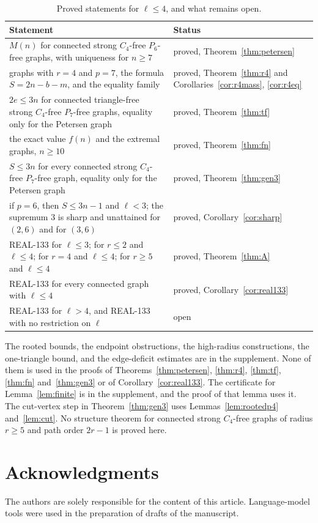 \documentclass[ASNA]{USG}
\theoremstyle{WBstyletwo}
\numberwithin{equation}{section}
\newcommand{\lr}{\ell}
\newcommand{\pp}{p}
\begin{document}
\begin{table}[ht]
\centering\small
\begin{tabular}{@{}>{\raggedright\arraybackslash}p{8.6cm}>{\raggedright\arraybackslash}p{5.0cm}@{}}
\toprule
Statement & Status\\
\midrule
$M(n)$ for connected strong $C_4$-free $P_6$-free graphs, with uniqueness for $n\ge 7$ & proved, Theorem~\ref{thm:petersen}\\
graphs with $r=4$ and $\pp=7$, the formula $S=2n-b-m$, and the equality family & proved, Theorem~\ref{thm:r4} and Corollaries~\ref{cor:r4mass}, \ref{cor:r4eq}\\
$2e\le 3n$ for connected triangle-free strong $C_4$-free $P_7$-free graphs, equality only for the Petersen graph & proved, Theorem~\ref{thm:tf}\\
the exact value $f(n)$ and the extremal graphs, $n\ge 10$ & proved, Theorem~\ref{thm:fn}\\
$S\le 3n$ for every connected strong $C_4$-free $P_7$-free graph, equality only for the Petersen graph & proved, Theorem~\ref{thm:gen3}\\
if $\pp=6$, then $S\le 3n-1$ and $\lr<3$; the supremum $3$ is sharp and unattained for $(2,6)$ and for $(3,6)$ & proved, Corollary~\ref{cor:sharp}\\
REAL-133 for $\lr\le 3$; for $r\le 2$ and $\lr\le 4$; for $r=4$ and $\lr\le 4$; for $r\ge 5$ and $\lr\le 4$ & proved, Theorem~\ref{thm:A}\\
REAL-133 for every connected graph with $\lr\le 4$ & proved, Corollary~\ref{cor:real133}\\
REAL-133 for $\lr>4$, and REAL-133 with no restriction on $\lr$ & open\\
\bottomrule
\end{tabular}
\caption{Proved statements for $\lr\le 4$, and what remains open.}\label{tab:status}
\end{table}

The rooted bounds, the endpoint obstructions, the high-radius constructions, the one-triangle bound, and the edge-deficit estimates are in the supplement. None of them is used in the proofs of Theorems~\ref{thm:petersen}, \ref{thm:r4}, \ref{thm:tf}, \ref{thm:fn} and~\ref{thm:gen3} or of Corollary~\ref{cor:real133}. The certificate for Lemma~\ref{lem:finite} is in the supplement, and the proof of that lemma uses it. The cut-vertex step in Theorem~\ref{thm:gen3} uses Lemmas~\ref{lem:rootedp4} and~\ref{lem:cut}. No structure theorem for connected strong $C_4$-free graphs of radius $r\ge 5$ and path order $2r-1$ is proved here.

\section*{Acknowledgments}
The authors are solely responsible for the content of this article. Language-model tools were used in the preparation of drafts of the manuscript.


\end{document}
